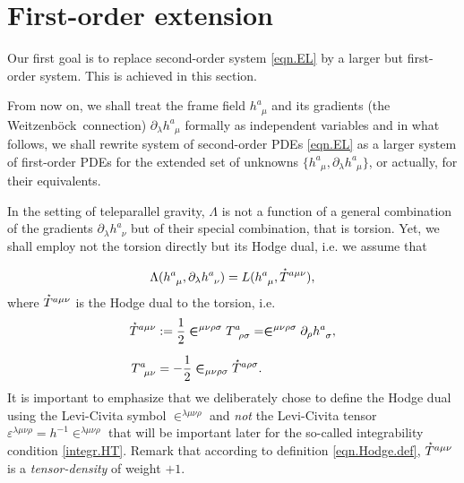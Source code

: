 \documentclass[
10pt, %
a4paper, %
oneside, %
twocolumn,
headinclude,footinclude, %
BCOR5mm, %
]{scrartcl}
\newcommand{\IP}[1]{{\color{Red}[IP:\ \ #1]}}
\newcommand{\pd}[1]{\partial_{#1}}
\newcommand{\tetrsymbol}{h}
\newcommand{\tetr}[2]{\tetrsymbol^{#1}_{\phantom{#1}#2}}
\newcommand{\detTetr}{\tetrsymbol}
\newcommand{\D}[1]{\partial_{#1}} %
\newcommand{\Tors}[2]{T^{#1}_{\phantom{#1}#2}}
\newcommand{\We}{Weitzenb\"ock}
\newcommand{\Lag}{\Lambda}	%
\newcommand{\Laghodge}{L}%
\newcommand{\LCsymb}{\bm{\in}}    %
\newcommand{\LCtens}{\varepsilon} %
\newcommand{\HDT}[1]{\accentset{\star}{T}^{#1}}
\begin{document}
	
	
	\section{First-order extension}\label{sec.PDEs}
	
	Our first goal is to replace second-order system \eqref{eqn.EL} by a larger but first-order 
	system. 
	This is achieved in this section.
	
	From now on, we shall treat the frame field $ \tetr{a}{\mu} $ and its 
	gradients (the 
	\We\ 
	connection) $ 
	\pd{\lambda}\tetr{a}{\mu} $ formally as independent variables and in what 
	follows, we shall rewrite 
	system 
	of second-order PDEs \eqref{eqn.EL} as a larger system of first-order PDEs for the extended set 
	of  
	unknowns $ \{ \tetr{a}{\mu},\pd{\lambda}\tetr{a}{\mu} \} $, or actually, for their equivalents.
	
	In the setting of teleparallel gravity, $ \Lag $ is not a function of a general combination 
	of 
	the gradients $ \pd{\lambda}\tetr{a}{\nu} $ but of their special combination, that is torsion. 
	Yet, 
	we shall employ not the torsion directly but its Hodge dual, i.e. we assume that
	
	\begin{equation}\label{eqn.Lagrangians}
		\Lag(\tetr{a}{\mu},\pd{\lambda}\tetr{a}{\nu}) = 
		\Laghodge(\tetr{a}{\mu},\HDT{a\mu\nu}),
	\end{equation}
	where $ \HDT{a\mu\nu} $ is the Hodge dual to the 
	torsion, i.e.
	\begin{subequations}
		\begin{align}\label{eqn.Hodge.def}
			\HDT{a\mu\nu} &:= \frac{1}{2}\LCsymb^{\mu\nu\rho\sigma}\Tors{a}{\rho\sigma} = 
			\LCsymb^{\mu\nu\rho\sigma}\D{\rho}\tetr{a}{\sigma}, \\[2mm] 
			\Tors{a}{\mu\nu} &= 
			-\frac{1}{2}\LCsymb_{\mu\nu\rho\sigma}\HDT{a\rho\sigma}.
		\end{align}	
	\end{subequations}
	It is important to emphasize that we deliberately chose to define the Hodge dual using the 
	Levi-Civita symbol $ 
	\LCsymb^{\lambda\mu\nu\rho} $ and \emph{not} the Levi-Civita tensor $ 
	\LCtens^{\lambda\mu\nu\rho} = 
	\detTetr^{-1} 
	\LCsymb^{\lambda\mu\nu\rho} $ that will be important later for 
	the so-called integrability condition \eqref{integr.HT}.
	Remark that according to definition \eqref{eqn.Hodge.def}, $ \HDT{a\mu\nu} $ is a  
	\emph{tensor-density} of weight $ +1 $.
	
\end{document}

